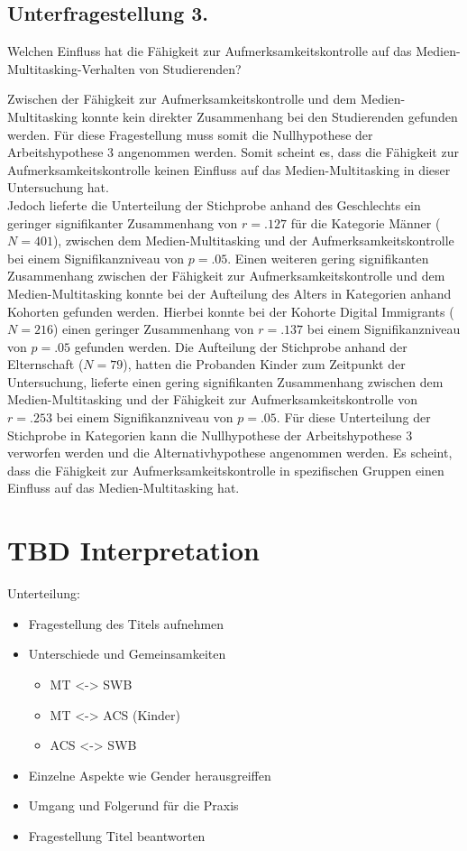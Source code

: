 \subsection{Unterfragestellung 3.} Welchen Einfluss hat die Fähigkeit zur Aufmerksamkeitskontrolle auf das Medien-Multitasking-Verhalten von Studierenden?

Zwischen der Fähigkeit zur Aufmerksamkeitskontrolle und dem Medien-Multitasking konnte kein direkter Zusammenhang bei den Studierenden gefunden werden. Für diese Fragestellung muss somit die Nullhypothese der Arbeitshypothese 3 angenommen werden. Somit scheint es, dass die Fähigkeit zur Aufmerksamkeitskontrolle keinen Einfluss auf das Medien-Multitasking in dieser Untersuchung hat. \\
Jedoch lieferte die Unterteilung der Stichprobe anhand des Geschlechts ein geringer signifikanter Zusammenhang von $r=.127$ für die Kategorie Männer ($N=401$), zwischen dem Medien-Multitasking und der Aufmerksamkeitskontrolle bei einem Signifikanzniveau von $p=.05$. Einen weiteren gering signifikanten Zusammenhang zwischen der Fähigkeit zur Aufmerksamkeitskontrolle und dem Medien-Multitasking konnte bei der Aufteilung des Alters in Kategorien anhand Kohorten gefunden werden. Hierbei konnte bei der Kohorte Digital Immigrants ($N=216$) einen geringer Zusammenhang von $r=.137$ bei einem Signifikanzniveau von $p=.05$ gefunden werden. Die Aufteilung der Stichprobe anhand der Elternschaft ($N=79$), hatten die Probanden Kinder zum Zeitpunkt der Untersuchung, lieferte einen gering signifikanten Zusammenhang zwischen dem Medien-Multitasking und der Fähigkeit zur Aufmerksamkeitskontrolle von $r=.253$ bei einem Signifikanzniveau von $p=.05$. Für diese Unterteilung der Stichprobe in Kategorien kann die Nullhypothese der Arbeitshypothese 3 verworfen werden und die Alternativhypothese angenommen werden. Es scheint, dass die Fähigkeit zur Aufmerksamkeitskontrolle in spezifischen Gruppen einen Einfluss auf das Medien-Multitasking hat.

\section{TBD Interpretation}\label{section.diskussion.interpretation}
Unterteilung:
\begin{itemize}
    \item Fragestellung des Titels aufnehmen
    \item Unterschiede und Gemeinsamkeiten
    \begin{itemize}
        \item MT <-> SWB
        \item MT <-> ACS (Kinder)
        \item ACS <-> SWB
    \end{itemize}
    \item Einzelne Aspekte wie Gender herausgreiffen
    \item Umgang und Folgerund für die Praxis
    \item Fragestellung Titel beantworten
\end{itemize}

